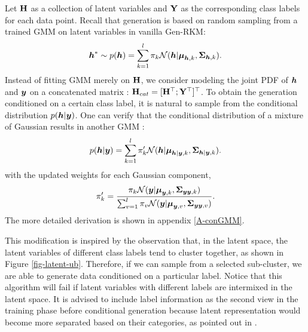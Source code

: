 Let $\mathbf{H}$ as a collection of latent variables and $\mathbf{Y}$ as the corresponding class labels for each data point. Recall that generation is based on random sampling from a trained GMM on latent variables in vanilla Gen-RKM:
\begin{equation}
    \boldsymbol{h}^{*}\sim p(\boldsymbol{h}) = \sum_{k=1}^{l}\pi_k\mathcal{N}(\boldsymbol{h} | \boldsymbol{\mu}_{\boldsymbol{h},k},\mathbf{\Sigma}_{\boldsymbol{h},k}).
\end{equation}
Instead of fitting GMM merely on $\mathbf{H}$, we consider modeling the joint PDF of $\boldsymbol{h}$ and $\boldsymbol{y}$ on a concatenated matrix : $\mathbf{H}_{cat} = [\mathbf{H}^\top; \mathbf{Y}^\top]^\top$. To obtain the generation conditioned on a certain class label, it is natural to sample from the conditional distribution $p(\boldsymbol{h}|\boldsymbol{y})$. One can verify that the conditional distribution of a mixture of Gaussian results in another GMM :
\begin{equation}
    p(\boldsymbol{h} | \boldsymbol{y}) = \sum_{k=1}^{l}\pi_k^{\prime}\mathcal{N}(\boldsymbol{h} | \boldsymbol{\mu}_{\boldsymbol{h}|\boldsymbol{y},k},\mathbf{\Sigma}_{\boldsymbol{h}|\boldsymbol{y},k}).
\end{equation}
with the updated weights for each Gaussian component,
\begin{equation}
    \pi_k^{\prime} = \frac{\pi_k \mathcal{N}(\boldsymbol{y}|\boldsymbol{\mu}_{\boldsymbol{y},k},\mathbf{\Sigma}_{\boldsymbol{y}\boldsymbol{y},k})}{\sum_{v=1}^{l}\pi_{v}\mathcal{N}(\boldsymbol{y} | \boldsymbol{\mu}_{\boldsymbol{y},v},\mathbf{\Sigma}_{\boldsymbol{y}\boldsymbol{y},v})}.
\end{equation}
The more detailed derivation is shown in appendix \ref{A-conGMM}.


This modification is inspired by the observation that, in the latent space, the latent variables of different class labels tend to cluster together, as shown in Figure \ref{fig-latent-ub}. Therefore, if we can sample from a selected sub-cluster, we are able to generate data conditioned on a particular label. Notice that this algorithm will fail if latent variables with different labels are intermixed in the latent space. It is advised to include label information as the second view in the training phase before conditional generation because latent representation would become more separated based on their categories, as pointed out in \cite{pandeyGenerativeRestrictedKernel2021}.


